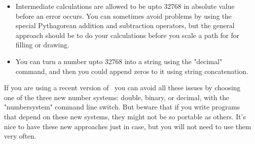\documentclass[a4paper,landscape]{article}
\begin{document}
\begin{itemize}
    \item Intermediate calculations are allowed to be upto 32768 in absolute value
        before an error occurs.  You can sometimes avoid problems by using the
        special Pythagorean addition and subtraction operators, but the general
        approach should be to do your calculations before you scale a path for
        for filling or drawing.

    \item You can turn a number upto 32768 into a string using the "decimal"
        command, and then you could append zeros to it using string concatenation.

\end{itemize}

If you are using a recent version of \MP\ you can avoid all these issues by choosing one of
the three new number systems: double, binary, or decimal, with the "numbersystem"
command line switch.  But beware that if you write programs that depend on these new
systems, they might not be so portable as others.  It's nice to have these new
approaches just in case, but you will not need to use them very often.
\end{document}
